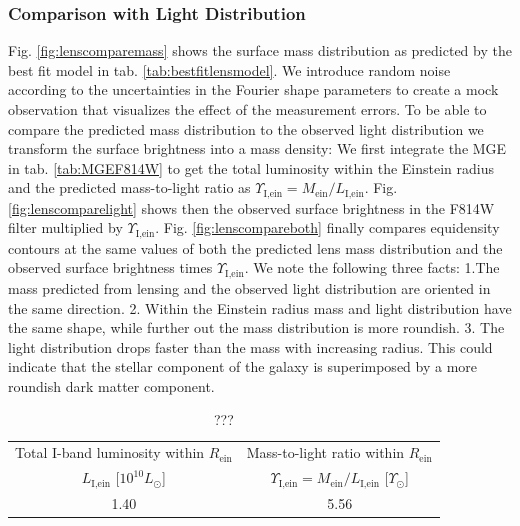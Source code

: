 \documentclass[useAMS,usenatbib]{mn2e}
\begin{document}
\subsubsection{Comparison with Light Distribution}

Fig. \ref{fig:lenscomparemass} shows the surface mass distribution as predicted by the best fit model in tab. \ref{tab:bestfitlensmodel}. We introduce random noise according to the uncertainties in the Fourier shape parameters to create a mock observation that visualizes the effect of the measurement errors. To be able to compare the predicted mass distribution to the observed light distribution we transform the surface brightness into a mass density: We first integrate the MGE in tab. \ref{tab:MGEF814W} to get the total luminosity within the Einstein radius and the predicted mass-to-light ratio as $\Upsilon_\text{I,ein} = M_\text{ein} / L_\text{I,ein}$. Fig. \ref{fig:lenscomparelight} shows then the observed surface brightness in the F814W filter multiplied by $\Upsilon_\text{I,ein}$.  Fig. \ref{fig:lenscompareboth} finally compares equidensity contours at the same values of both the predicted lens mass distribution and the observed surface brightness times $\Upsilon_\text{I,ein}$. We note the following three facts: 1.The mass predicted from lensing and the observed light distribution are oriented in the same direction. 2. Within the Einstein radius mass and light distribution have the same shape, while further out the mass distribution is more roundish. 3. The light distribution drops faster than the mass with increasing radius. This could indicate that the stellar component of the galaxy is superimposed by a more roundish dark matter component.

\begin{table}
\centering
\caption{???}
\begin{tabular}{cc}
\hline
Total I-band luminosity within $R_\text{ein}$ & Mass-to-light ratio within $R_\text{ein}$\\
 $L_\text{I,ein}$ [$10^{10} L_\odot$] & $\Upsilon_\text{I,ein} = M_\text{ein} / L_\text{I,ein}$ [$\Upsilon_\odot$]\\\hline
1.40 & 5.56\\\hline
\end{tabular}  
\label{tab:einsteinML} 
\end{table}
\end{document}
